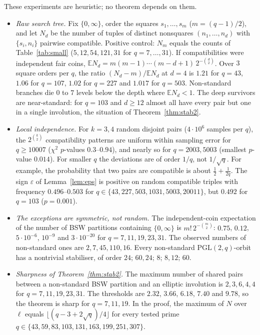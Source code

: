 \documentclass[11pt,a4paper]{article}
\theoremstyle{definition}
\theoremstyle{remark}
\newcommand{\PGL}{\mathrm{PGL}}
\begin{document}
These experiments are heuristic; no theorem depends on them.
\begin{itemize}
\item \emph{Raw search tree.} Fix $\{0,\infty\}$, order the squares $s_1,\dots,s_m$ ($m=(q-1)/2$), and let $N_d$ be
the number of tuples of distinct nonsquares $(n_1,\dots,n_d)$ with $\{s_i,n_i\}$ pairwise compatible. Positive
control: $N_m$ equals the counts of Table~\ref{tab:small}
($5,12,54,121,31$ for $q=7,\dots,31$). If compatibilities were independent fair coins,
$\mathbb E N_d=m(m-1)\cdots(m-d+1)\,2^{-\binom d2}$. Over $3$ square orders per $q$, the ratio $(N_d-m)/\mathbb E N_d$
at $d=4$ is $1.21$ for $q=43$, $1.06$ for $q=107$, $1.02$ for $q=227$ and $1.017$ for $q=503$. Non-standard branches
die $0$ to $7$ levels below the depth where $\mathbb E N_d<1$. The deep survivors are near-standard: for $q=103$ and
$d\ge12$ almost all have every pair but one in a single involution, the situation of Theorem~\ref{thm:stab2}.
\item \emph{Local independence.} For $k=3,4$ random disjoint pairs ($4\cdot10^6$ samples per $q$), the
$2^{\binom k2}$ compatibility patterns are uniform within sampling error for $q\ge10007$ ($\chi^2$ $p$-values
$0.3$--$0.94$), and nearly so for $q=2003,5003$ (smallest $p$-value $0.014$). For smaller $q$ the deviations are of order $1/q$, not $1/\sqrt q$. For example, the probability
that two pairs are compatible is about $\frac12+\frac1{2q}$. The sign $\varepsilon$ of
Lemma~\ref{lem:eps} is positive on random compatible triples with frequency $0.496$--$0.503$ for
$q\in\{43,227,503,1031,5003,20011\}$, but $0.492$ for $q=103$ ($p=0.001$).
\item \emph{The exceptions are symmetric, not random.} The independent-coin expectation of the number of BSW
partitions containing $\{0,\infty\}$ is $m!\,2^{-\binom m2}$: $0.75$, $0.12$, $5\cdot10^{-6}$, $10^{-9}$ and
$3\cdot10^{-20}$ for $q=7,11,19,23,31$. The observed numbers of non-standard ones are $2,7,45,110,16$. Every
non-standard $\PGL(2,q)$-orbit has a nontrivial stabiliser, of order $24$; $60,24$; $8$; $8,12$; $60$.
\item \emph{Sharpness of Theorem~\ref{thm:stab2}.} The maximum number of shared pairs between a non-standard BSW
partition and an elliptic involution is $2,3,6,4,4$ for $q=7,11,19,23,31$. The thresholds are $2.32$, $3.66$, $6.18$,
$7.40$ and $9.78$, so the theorem is sharp for $q=7,11,19$. In the proof, the maximum of $N$ over $\ell$ equals
$\lfloor(q-3+2\sqrt q)/4\rfloor$ for every tested prime $q\in\{43,59,83,103,131,163,199,251,307\}$.
\end{itemize}
\end{document}
